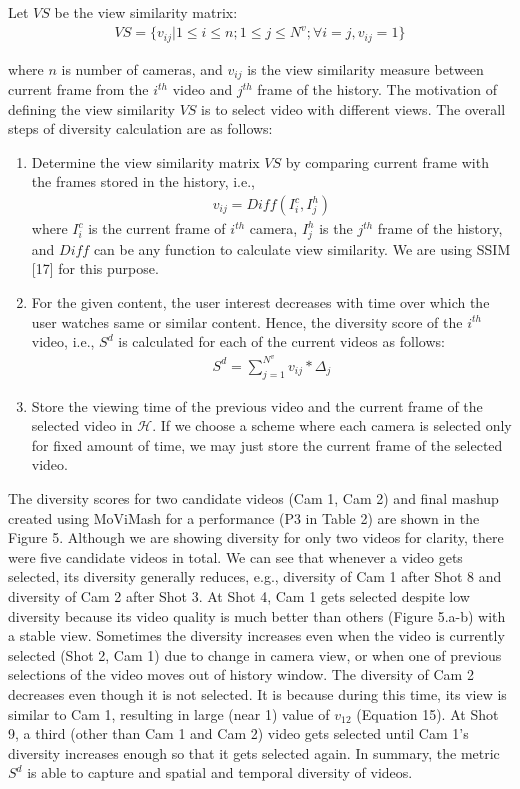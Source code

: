 \documentclass{sig-alternate-05-2015}
\begin{document}
Let $V S$ be the view similarity matrix:
\begin{eqnarray}
V S = \{v_{ij} |1 \leq i \leq n; 1 \leq j \leq N^v; \forall i = j, v_{ij} = 1\}
\end{eqnarray}

where $n$ is number of cameras, and $v_{ij}$ is the view similarity
measure between current frame from the $i^{th}$ video and $j^{th}$ frame
of the history. The motivation of defining the view similarity $V S$ is
to select video with different views. The overall steps of diversity
calculation are as follows:

\begin{enumerate}
\item Determine the view similarity matrix $V S$ by comparing current
frame with the frames stored in the history, i.e.,
\begin{eqnarray}
v_{ij} = Diff(I^c_i , I^h_j )
\end{eqnarray}
where $I^c_i$ is the current frame of $i^{th}$ camera, $I^h_j$ is the $j^{th}$ frame of the history, and $Diff$ can be any function to calculate
view similarity. We are using SSIM [17] for this purpose.
\item For the given content, the user interest decreases with time
over which the user watches same or similar content. Hence,
the diversity score of the $i^{th}$ video, i.e., $S^d$ is calculated for
each of the current videos as follows:
\begin{eqnarray}
S^d=\sum^{N^v}_{j=1}v_{ij}*\Delta_j
\end{eqnarray}
\item Store the viewing time of the previous video and the current
frame of the selected video in $\mathcal{H}$. If we choose a scheme
where each camera is selected only for fixed amount of time,
we may just store the current frame of the selected video.
\end{enumerate}

The diversity scores for two candidate videos (Cam 1, Cam 2)
and final mashup created using MoViMash for a performance (P3
in Table 2) are shown in the Figure 5. Although we are showing
diversity for only two videos for clarity, there were five candidate
videos in total. We can see that whenever a video gets selected,
its diversity generally reduces, e.g., diversity of Cam 1 after Shot 8
and diversity of Cam 2 after Shot 3. At Shot 4, Cam 1 gets selected
despite low diversity because its video quality is much better than
others (Figure 5.a-b) with a stable view. Sometimes the diversity
increases even when the video is currently selected (Shot 2, Cam 1)
due to change in camera view, or when one of previous selections
of the video moves out of history window. The diversity of Cam 2
decreases even though it is not selected. It is because during this
time, its view is similar to Cam 1, resulting in large (near 1) value
of $v_{12}$ (Equation 15). At Shot 9, a third (other than Cam 1 and Cam
2) video gets selected until Cam 1's diversity increases enough so
that it gets selected again. In summary, the metric $S^d$ is able to
capture and spatial and temporal diversity of videos.
\end{document}

